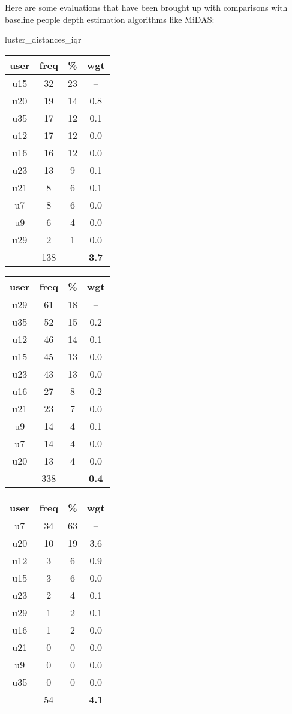 Here are some evaluations that have been brought up with comparisons with baseline people depth estimation algorithms like MiDAS:

luster_distances_iqr
\begin{tabular}{ |c|c|c|c| }
	\hline
	\textbf{user} & \textbf{freq} & \textbf{\%} & \textbf{wgt} \\
	\hline
	u15 & 32 & 23 & -- \\
	u20 & 19 & 14 & 0.8 \\
	u35 & 17 & 12 & 0.1 \\
	u12 & 17 & 12 & 0.0 \\
	u16 & 16 & 12 & 0.0 \\
	u23 & 13 & 9 & 0.1 \\
	u21 & 8 & 6 & 0.1 \\
	u7 & 8 & 6 & 0.0 \\
	u9 & 6 & 4 & 0.0 \\
	u29 & 2 & 1 & 0.0 \\
	 & 138 & & \textbf{3.7} \\
	\hline
\end{tabular}
\begin{tabular}{ |c|c|c|c| }
	\hline
	\textbf{user} & \textbf{freq} & \textbf{\%} & \textbf{wgt} \\
	\hline
	u29 & 61 & 18 & -- \\
	u35 & 52 & 15 & 0.2 \\
	u12 & 46 & 14 & 0.1 \\
	u15 & 45 & 13 & 0.0 \\
	u23 & 43 & 13 & 0.0 \\
	u16 & 27 & 8 & 0.2 \\
	u21 & 23 & 7 & 0.0 \\
	u9 & 14 & 4 & 0.1 \\
	u7 & 14 & 4 & 0.0 \\
	u20 & 13 & 4 & 0.0 \\
	 & 338 & & \textbf{0.4} \\
	\hline
\end{tabular}
\begin{tabular}{ |c|c|c|c| }
	\hline
	\textbf{user} & \textbf{freq} & \textbf{\%} & \textbf{wgt} \\
	\hline
	u7 & 34 & 63 & -- \\
	u20 & 10 & 19 & 3.6 \\
	u12 & 3 & 6 & 0.9 \\
	u15 & 3 & 6 & 0.0 \\
	u23 & 2 & 4 & 0.1 \\
	u29 & 1 & 2 & 0.1 \\
	u16 & 1 & 2 & 0.0 \\
	u21 & 0 & 0 & 0.0 \\
	u9 & 0 & 0 & 0.0 \\
	u35 & 0 & 0 & 0.0 \\
	 & 54 & & \textbf{4.1} \\
	\hline
\end{tabular}
